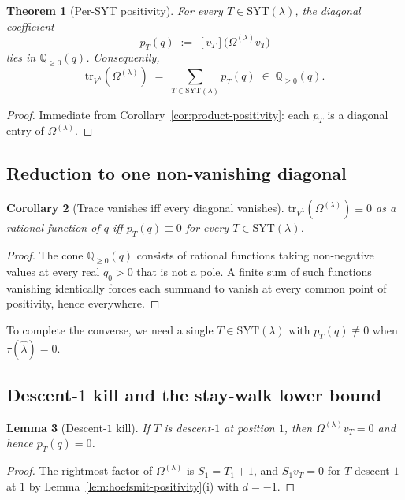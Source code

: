\documentclass[11pt]{article}
\newtheorem{theorem}{Theorem}[section]
\newtheorem{lemma}[theorem]{Lemma}
\newtheorem{corollary}[theorem]{Corollary}
\theoremstyle{definition}
\newcommand{\Vlam}{V^{\lambda}}
\newcommand{\Om}{\Omega}
\newcommand{\bla}{\widehat\lambda}
\newcommand{\SYT}{\mathrm{SYT}}
\newcommand{\tr}{\mathrm{tr}}
\begin{document}
\begin{theorem}[Per-SYT positivity]\label{thm:per-syt}
For every $T \in \SYT(\lambda)$, the diagonal coefficient
\[
   p_T(q) \;:=\; [v_T]\bigl(\Om^{(\lambda)} v_T\bigr)
\]
lies in $\mathbb{Q}_{\ge 0}(q)$.  Consequently,
\[
   \tr_{\Vlam}(\Om^{(\lambda)}) \;=\; \sum_{T \in \SYT(\lambda)} p_T(q) \;\in\; \mathbb{Q}_{\ge 0}(q).
\]
\end{theorem}

\begin{proof}
Immediate from Corollary~\ref{cor:product-positivity}: each $p_T$ is a diagonal entry of $\Om^{(\lambda)}$.
\end{proof}

\subsection{Reduction to one non-vanishing diagonal}

\begin{corollary}[Trace vanishes iff every diagonal vanishes]\label{cor:trace-iff-each}
$\tr_{\Vlam}(\Om^{(\lambda)}) \equiv 0$ as a rational function of $q$ iff $p_T(q) \equiv 0$ for every $T \in \SYT(\lambda)$.
\end{corollary}

\begin{proof}
The cone $\mathbb{Q}_{\ge 0}(q)$ consists of rational functions taking non-negative values at every real $q_0 > 0$ that is not a pole.  A finite sum of such functions vanishing identically forces each summand to vanish at every common point of positivity, hence everywhere.
\end{proof}

To complete the converse, we need a single $T \in \SYT(\lambda)$ with $p_T(q) \not\equiv 0$ when $\tau(\bla) = 0$.

\subsection{Descent-$1$ kill and the stay-walk lower bound}

\begin{lemma}[Descent-$1$ kill]\label{lem:descent1-kill}
If $T$ is descent-$1$ at position $1$, then $\Om^{(\lambda)} v_T = 0$ and hence $p_T(q) = 0$.
\end{lemma}

\begin{proof}
The rightmost factor of $\Om^{(\lambda)}$ is $S_1 = T_1 + 1$, and $S_1 v_T = 0$ for $T$ descent-$1$ at $1$ by Lemma~\ref{lem:hoefsmit-positivity}(i) with $d = -1$.
\end{proof}
\end{document}
